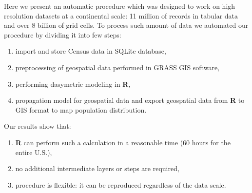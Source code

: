 \documentclass[\main/boa.tex]{subfiles}
\begin{document}
Here we present an automatic procedure which was designed to work on
high resolution datasets at a continental scale: 11 million of records
in tabular data and over 8 billion of grid cells. To process such amount
of data we automated our procedure by dividing it into few steps:

\begin{enumerate}
\def\labelenumi{\arabic{enumi}.}
\tightlist
\item
  import and store Census data in SQLite database,
\item
  preprocessing of geospatial data performed in GRASS GIS software,
\item
  performing dasymetric modeling in \textbf{R},
\item
  propagation model for geospatial data and export geospatial data from
  \textbf{R} to GIS format to map population distribution.
\end{enumerate}

Our results show that:

\begin{enumerate}
\def\labelenumi{\arabic{enumi}.}
\tightlist
\item
  \textbf{R} can perform such a calculation in a reasonable time (60
  hours for the entire U.S.),
\item
  no additional intermediate layers or steps are required,
\item
  procedure is flexible: it can be reproduced regardless of the data
  scale.
\end{enumerate}
\end{document}
